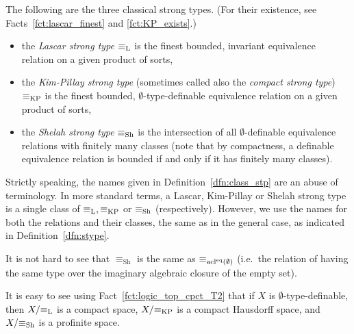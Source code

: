 	
	\begin{dfn}
		\label{dfn:class_stp}
		The following are the three classical strong types. (For their existence, see Facts~\ref{fct:lascar_finest} and \ref{fct:KP_exists}.)
		\begin{itemize}
			\item the \emph{Lascar strong type} $\equiv_{\mathrm{L}}$ is the finest bounded, invariant equivalence relation on a given product of sorts,
			\item the \emph{Kim-Pillay strong type} (sometimes called also the \emph{compact strong type}) $\equiv_{\mathrm{KP}}$ is the finest bounded, $\emptyset$-type-definable equivalence relation on a given product of sorts,
			\item the \emph{Shelah strong type} $\equiv_{\mathrm{Sh}}$ is the intersection of all $\emptyset$-definable equivalence relations with finitely many classes (note that by compactness, a definable equivalence relation is bounded if and only if it has finitely many classes).\xqed{\lozenge}
		\end{itemize}
	\end{dfn}
	
	\begin{rem}
		Strictly speaking, the names given in Definition~\ref{dfn:class_stp} are an abuse of terminology. In more standard terms, a Lascar, Kim-Pillay or Shelah strong type is a single class of $\equiv_{\mathrm{L}},\equiv_{\mathrm{KP}}$ or $\equiv_{\mathrm{Sh}}$ (respectively). However, we use the names for both the relations and their classes, the same as in the general case, as indicated in Definition~\ref{dfn:stype}. \xqed{\lozenge}
	\end{rem}
	
	\begin{rem}
		It is not hard to see that $\equiv_{\textrm{Sh}}$ is the same as $\equiv_{\operatorname{{acl}}^{\textrm{eq}}(\emptyset)}$ (i.e.\ the relation of having the same type over the imaginary algebraic closure of the empty set).\xqed{\lozenge}
	\end{rem}
	
	\begin{rem}
		It is easy to see using Fact~\ref{fct:logic_top_cpct_T2} that if $X$ is $\emptyset$-type-definable, then $X/{\equiv_{\mathrm{L}}}$ is a compact space, $X/{\equiv_{\mathrm{KP}}}$ is a compact Hausdorff space, and $X/{\equiv_{\mathrm{Sh}}}$ is a profinite space.\xqed{\lozenge}
	\end{rem}
	
